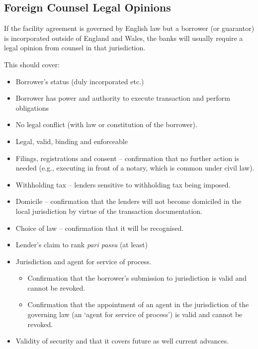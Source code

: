 \documentclass[
]{article}
\providecommand{\tightlist}{%
  \setlength{\itemsep}{0pt}\setlength{\parskip}{0pt}}
\begin{document}
\hypertarget{foreign-counsel-legal-opinions}{%
\subsection{Foreign Counsel Legal
Opinions}\label{foreign-counsel-legal-opinions}}

If the facility agreement is governed by English law but a borrower (or
guarantor) is incorporated outside of England and Wales, the banks will
usually require a legal opinion from counsel in that jurisdiction.

This should cover:

\begin{itemize}
\tightlist
\item
  Borrower's status (duly incorporated etc.)
\item
  Borrower has power and authority to execute transaction and perform
  obligations
\item
  No legal conflict (with law or constitution of the borrower).
\item
  Legal, valid, binding and enforceable
\item
  Filings, registrations and consent -- confirmation that no further
  action is needed (e.g., executing in front of a notary, which is
  common under civil law).
\item
  Withholding tax -- lenders sensitive to withholding tax being imposed.
\item
  Domicile -- confirmation that the lenders will not become domiciled in
  the local jurisdiction by virtue of the transaction documentation.
\item
  Choice of law -- confirmation that it will be recognised.
\item
  Lender's claim to rank \emph{pari passu} (at least)
\item
  Jurisdiction and agent for service of process.

  \begin{itemize}
  \tightlist
  \item
    Confirmation that the borrower's submission to jurisdiction is valid
    and cannot be revoked.
  \item
    Confirmation that the appointment of an agent in the jurisdiction of
    the governing law (an `agent for service of process') is valid and
    cannot be revoked.
  \end{itemize}
\item
  Validity of security and that it covers future as well current
  advances.
\end{itemize}
\end{document}
